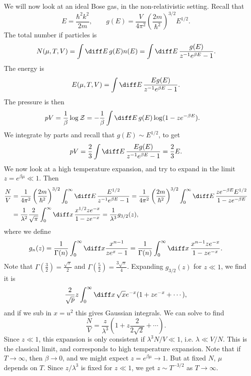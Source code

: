 \documentclass[12pt]{article}
\begin{document}
We will now look at an ideal Bose gas, in the non-relativistic setting. Recall that
\[
E = \frac{\hbar^2 k^2}{2m}, \qquad g(E) = \frac{V}{4\pi^2} \left( \frac{2m}{\hbar^2} \right)^{3/2} E^{1/2}.
\]
The total number if particles is
\[
N(\mu, T, V) = \int \diff E \, g(E) n(E) = \int \diff E \, \frac{g(E)}{z^{-1}e^{\beta E} - 1}.
\]
The energy is
\[
E(\mu, T, V) = \int \diff E \, \frac{E g(E)}{z^{-1} e^{\beta E} - 1}.
\]
The pressure is then
\begin{align*}
	pV &= \frac{1}{\beta} \log \mathcal{Z} = - \frac{1}{\beta} \int \diff E \, g(E) \log(1 - z e^{-\beta E}).
\end{align*}
We integrate by parts and recall that $g(E) \sim E^{1/2}$, to get
\[
pV = \frac{2}{3} \int \diff E \, \frac{E g(E)}{z^{-1} e^{\beta E} - 1} = \frac{2}{3} E.
\]
We now look at a high temperature expansion, and try to expand in the limit $z = e^{\beta \mu} \ll 1$. Then
\begin{align*}
	\frac{N}{V} &= \frac{1}{4 \pi^2} \left( \frac{2m}{\hbar^2} \right)^{3/2} \int_0^\infty \diff E \, \frac{E^{1/2}}{z^{-1} e^{\beta E} - 1} = \frac{1}{4 \pi^2} \left( \frac{2m}{\hbar^2} \right)^{3/2} \int_0^{\infty} \diff E \, \frac{ze^{-\beta E} E^{1/2}}{1 - z e^{-\beta E}} \\
		    &= \frac{1}{\lambda^2} \frac{2}{\sqrt \pi} \int_0^\infty \diff x \, \frac{x^{1/2} z e^{-x}}{1 - z e^{-x}} = \frac{1}{\lambda^3} g_{3/2}(z),
\end{align*}
where we define
\[
g_n(z) = \frac{1}{\Gamma(n)} \int_0^{\infty} \diff x \frac{x^{n-1}}{z e^{x} - 1} = \frac{1}{\Gamma(n)} \int_0^\infty \diff x \, \frac{x^{n-1} z e^{-x}}{1 - z e^{-x}}.
\]
Note that $\Gamma(\frac{3}{2}) = \frac{\sqrt \pi}{2}$ and $\Gamma (\frac{5}{2})= \frac{3 \sqrt \pi}{4}$. Expanding $g_{3/2}(z)$ for $z \ll 1$, we find it is
\[
	\frac{2}{\sqrt p} z \int_0^\infty \diff x \, \sqrt x e^{-x} (1 + z e^{-x} + \cdots),
\]
and if we sub in $x = u^2$ this gives Gaussian integrals. We can solve to find
\[
\frac{N}{V} = \frac{z}{\lambda^3}\left(1 + z \frac{2}{2 \sqrt 2} + \cdots \right).
\]
Since $z \ll 1$, this expansion is only consistent if $\lambda^3N/V \ll 1$, i.e. $\lambda \ll V/N$. This is the classical limit, and corresponds to high temperature expansion. Note that if $T \to \infty$, then $\beta \to 0$, and we might expect $z = e^{\beta \mu} \to 1$. But at fixed $N$, $\mu$ depends on $T$. Since $z/\lambda^3$ is fixed for $z \ll 1$, we get $z \sim T^{-3/2}$ as $T \to \infty$.
\end{document}
